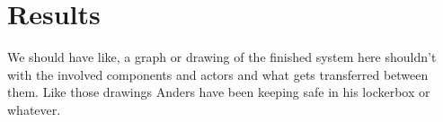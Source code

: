 \chapter{Results}
We should have like, a graph or drawing of the finished system here shouldn't with the involved components and actors and what gets transferred between them.
Like those drawings Anders have been keeping safe in his lockerbox or whatever.

